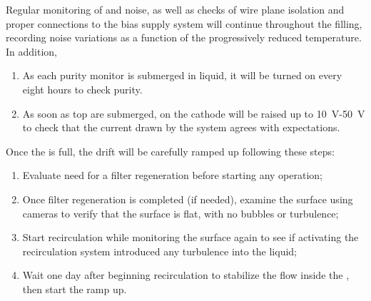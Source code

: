 Regular monitoring of  and  noise, as well as checks of wire plane isolation and proper connections to the bias supply system will continue throughout the filling, recording noise variations as a function of the progressively reduced temperature. In addition,

\begin{enumerate}

    \item As each purity monitor is submerged in liquid, it will be turned on every eight hours to check  purity. 
    
    \item As soon as top  are submerged,  on the cathode will be raised up to \SI{10}{V}-\SI{50}{V} to check that the current drawn by the system agrees with expectations.

\end{enumerate}

Once the  is full, the drift  will be carefully ramped up following these steps:

\begin{enumerate}

    \item Evaluate need for a filter regeneration before starting any operation;

    \item Once filter regeneration is completed (if needed), examine the  surface 
    using cameras to verify that the surface is flat, with no bubbles or turbulence;
    
    \item Start  recirculation while monitoring the  surface 
    again to see if activating the recirculation system introduced any turbulence into the liquid;
    
    \item Wait one day after beginning  recirculation to stabilize the  flow inside the , then start the  ramp up.
    
\end{enumerate}

